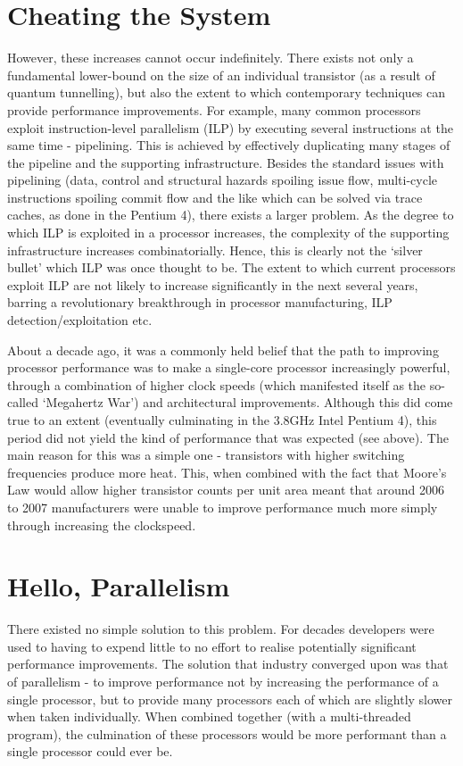 \section{Cheating the System} \label{sec:introduction/cheating}
However, these increases cannot occur indefinitely. There exists not only a fundamental lower-bound on the size of an individual transistor (as a result of quantum tunnelling), but also the extent to which contemporary techniques can provide performance improvements. For example, many common processors exploit instruction-level parallelism (ILP) by executing several instructions at the same time - pipelining. This is achieved by effectively duplicating many stages of the pipeline and the supporting infrastructure. Besides the standard issues with pipelining (data, control and structural hazards spoiling issue flow, multi-cycle instructions spoiling commit flow and the like which can be solved via trace caches, as done in the Pentium 4), there exists a larger problem. As the degree to which ILP is exploited in a processor increases, the complexity of the supporting infrastructure increases combinatorially. Hence, this is clearly not the `silver bullet' which ILP was once thought to be. The extent to which current processors exploit ILP are not likely to increase significantly in the next several years, barring a revolutionary breakthrough in processor manufacturing, ILP detection/exploitation etc.

About a decade ago, it was a commonly held belief that the path to improving processor performance was to make a single-core processor increasingly powerful, through a combination of higher clock speeds (which manifested itself as the so-called `Megahertz War') and architectural improvements. Although this did come true to an extent (eventually culminating in the 3.8GHz Intel Pentium 4), this period did not yield the kind of performance that was expected (see above). The main reason for this was a simple one - transistors with higher switching frequencies produce more heat. This, when combined with the fact that Moore's Law would allow higher transistor counts per unit area meant that around 2006 to 2007 manufacturers were unable to improve performance much more simply through increasing the clockspeed.

\section{Hello, Parallelism} \label{sec:introduction/parallelism}
There existed no simple solution to this problem. For decades developers were used to having to expend little to no effort to realise potentially significant performance improvements. The solution that industry converged upon was that of parallelism - to improve performance not by increasing the performance of a single processor, but to provide many processors each of which are slightly slower when taken individually. When combined together (with a multi-threaded program), the culmination of these processors would be more performant than a single processor could ever be.

